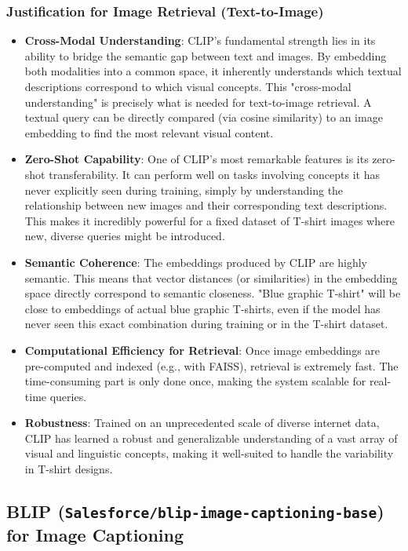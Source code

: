 \documentclass{article}
\begin{document}
\subsubsection{Justification for Image Retrieval (Text-to-Image)}
\begin{itemize}
    \item \textbf{Cross-Modal Understanding}: CLIP's fundamental strength lies in its ability to bridge the semantic gap between text and images. By embedding both modalities into a common space, it inherently understands which textual descriptions correspond to which visual concepts. This "cross-modal understanding" is precisely what is needed for text-to-image retrieval. A textual query can be directly compared (via cosine similarity) to an image embedding to find the most relevant visual content.
    \item \textbf{Zero-Shot Capability}: One of CLIP's most remarkable features is its zero-shot transferability. It can perform well on tasks involving concepts it has never explicitly seen during training, simply by understanding the relationship between new images and their corresponding text descriptions. This makes it incredibly powerful for a fixed dataset of T-shirt images where new, diverse queries might be introduced.
    \item \textbf{Semantic Coherence}: The embeddings produced by CLIP are highly semantic. This means that vector distances (or similarities) in the embedding space directly correspond to semantic closeness. "Blue graphic T-shirt" will be close to embeddings of actual blue graphic T-shirts, even if the model has never seen this exact combination during training or in the T-shirt dataset.
    \item \textbf{Computational Efficiency for Retrieval}: Once image embeddings are pre-computed and indexed (e.g., with FAISS), retrieval is extremely fast. The time-consuming part is only done once, making the system scalable for real-time queries.
    \item \textbf{Robustness}: Trained on an unprecedented scale of diverse internet data, CLIP has learned a robust and generalizable understanding of a vast array of visual and linguistic concepts, making it well-suited to handle the variability in T-shirt designs.
\end{itemize}

\subsection{BLIP (\texttt{Salesforce/blip-image-captioning-base}) for Image Captioning}
\end{document}

